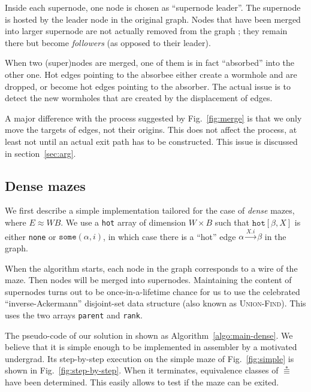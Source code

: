 \documentclass[a4paper,UKenglish,cleveref, autoref]{lipics-v2021}
\newcommand{\bigO}[1]{\ensuremath{\mathcal{O}\left( #1 \right)} }
\begin{document}
Inside each supernode, one node is chosen as ``supernode leader''. The supernode
is hosted by the leader node in the original graph. Nodes that have been merged
into larger supernode are not actually removed from the graph ; they remain
there but become \emph{followers} (as opposed to their leader).

When two (super)nodes are merged, one of them is in fact ``absorbed'' into the
other one. Hot edges pointing to the absorbee either create a wormhole and are
dropped, or become hot edges pointing to the absorber.  The actual issue is to
detect the new wormholes that are created by the displacement of edges.

A major difference with the process suggested by Fig.~\ref{fig:merge} is that we
only move the targets of edges, not their origins. This does not affect the
process, at least not until an actual exit path has to be constructed. This
issue is discussed in section~\ref{sec:arg}.

\subsection{Dense mazes}
\label{sec:dense}

We first describe a simple implementation tailored for the case of \emph{dense}
mazes, where $E \approx WB$. We use a \texttt{hot} array of dimension
$W \times B$ such that $\texttt{hot}[\beta,X]$ is either \texttt{none} or
$\texttt{some} (\alpha, i)$, in which case there is a ``hot'' edge
$\alpha \xrightarrow{X.i} \beta$ in the graph. %

When the algorithm starts, each node in the graph corresponds to a wire of the
maze. Then nodes will be merged into supernodes. Maintaining the content of
supernodes turns out to be once-in-a-lifetime chance for us to use the
celebrated ``inverse-Ackermann'' disjoint-set data structure (also known as
\textsc{Union-Find}). This uses the two arrays \texttt{parent} and
\texttt{rank}.

The pseudo-code of our solution in shown as Algorithm~\ref{algo:main-dense}. We
believe that it is simple enough to be implemented in assembler by a motivated
undergrad. Its step-by-step execution on the simple maze of
Fig.~\ref{fig:simple} is shown in Fig.~\ref{fig:step-by-step}. When it
terminates, equivalence classes of $\stackrel{*}{\equiv}$ have been
determined. This easily allows to test if the maze can be exited.
\end{document}
